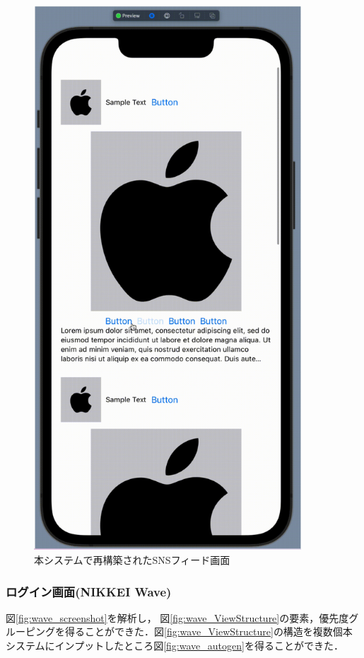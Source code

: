 \begin{figure}[htbp]
  \begin{minipage}{\hsize}
    \begin{center}
       \includegraphics[width=100mm]{img/Instagram_autogen.png}
    \end{center}
    \caption{本システムで再構築されたSNSフィード画面}
    \label{fig:instagram_autogen}
  \end{minipage}
\end{figure}

\subsubsection{ログイン画面(NIKKEI Wave)}
図\ref{fig:wave_screenshot}を解析し， 図\ref{fig:wave_ViewStructure}の要素，優先度グルーピングを得ることができた．図\ref{fig:wave_ViewStructure}の構造を複数個本システムにインプットしたところ図\ref{fig:wave_autogen}を得ることができた．

